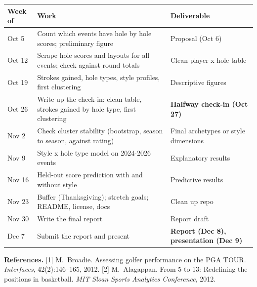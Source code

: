 \documentclass[10pt]{article}
\begin{document}
\begin{table}[H]
\centering
\footnotesize
\setlength{\tabcolsep}{4pt}
\renewcommand{\arraystretch}{0.92}
\begin{tabularx}{\textwidth}{@{}p{1.25cm}Y>{\raggedright\arraybackslash}p{5.7cm}@{}}
\toprule
\textbf{Week of} & \textbf{Work} & \textbf{Deliverable} \\
\midrule
Oct 5  & Count which events have hole by hole scores; preliminary figure &
  Proposal (Oct 6) \\
Oct 12 & Scrape hole scores and layouts for all events; check against round totals &
  Clean player x hole table \\
Oct 19 & Strokes gained, hole types, style profiles, first clustering &
  Descriptive figures \\
Oct 26 & Write up the check-in: clean table, strokes gained by hole type, first clustering &
  \textbf{Halfway check-in (Oct 27)} \\
Nov 2  & Check cluster stability (bootstrap, season to season, against rating) &
  Final archetypes or style dimensions \\
Nov 9  & Style x hole type model on 2024-2026 events & Explanatory results \\
Nov 16 & Held-out score prediction with and without style & Predictive results \\
Nov 23 & Buffer (Thanksgiving); stretch goals; README, license, docs &
  Clean up repo \\
Nov 30 & Write the final report & Report draft \\
Dec 7  & Submit the report and present &
  \textbf{Report (Dec 8), presentation (Dec 9)} \\
\bottomrule
\end{tabularx}
\end{table}

{\footnotesize
\textbf{References.}
[1] M.~Broadie. Assessing golfer performance on the PGA TOUR.
\emph{Interfaces}, 42(2):146--165, 2012.
[2] M.~Alagappan. From 5 to 13: Redefining the positions in basketball.
\emph{MIT Sloan Sports Analytics Conference}, 2012.
}
\end{document}
